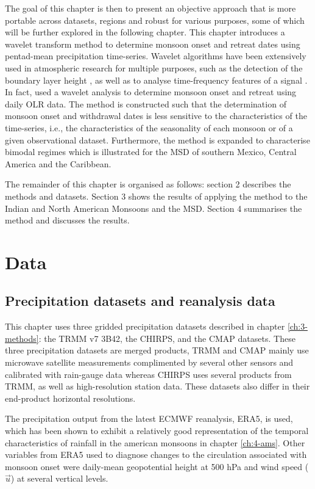 The goal of this chapter is then to present an objective approach that is more portable across datasets, regions and robust for various purposes, some of which will be further explored in the following chapter.   
This chapter introduces a wavelet transform method to determine monsoon onset and retreat dates using pentad-mean precipitation time-series. Wavelet algorithms have been extensively used in atmospheric research for multiple purposes, such as the detection of the boundary layer height \citep[e.g.][]{brooks2003}, as well as to analyse time-frequency features of a signal \citep[e.g.][]{whitcher2000,dimdore2021}. In fact, \cite{allen2017} used a wavelet analysis to determine monsoon onset and retreat using daily OLR data.
The method is constructed such that the determination of monsoon onset and withdrawal dates is less sensitive to the characteristics of the time-series, i.e., the characteristics of the seasonality of each monsoon  or of a given observational dataset. Furthermore, the method is expanded to characterise bimodal regimes which is illustrated for the MSD of southern Mexico, Central America and the Caribbean.

The remainder of this chapter is organised as follows: section 2 describes the methods and datasets. Section 3 shows the results of applying the method to the Indian and North American Monsoons and the MSD. Section 4 summarises the method and discusses the results.

\section{Data}

\subsection{Precipitation datasets and reanalysis data}

This chapter uses three gridded precipitation datasets described in chapter \ref{ch:3-methods}: the TRMM v7 3B42, the CHIRPS, and the CMAP datasets.
These three precipitation datasets are merged products, TRMM and CMAP mainly use microwave satellite measurements complimented by several other sensors and calibrated with rain-gauge data whereas CHIRPS uses several products from TRMM, as well as high-resolution station data. These datasets also differ in their end-product horizontal resolutions.

The precipitation output from the latest ECMWF reanalysis, ERA5, is used, which has been shown to exhibit a relatively good representation of the temporal characteristics of rainfall in the american monsoons in chapter \ref{ch:4-ams}. 
Other variables from ERA5 used to diagnose changes to the circulation associated with monsoon onset were daily-mean geopotential height at 500 hPa and wind speed ($\vec{u}$) at several vertical levels. 

